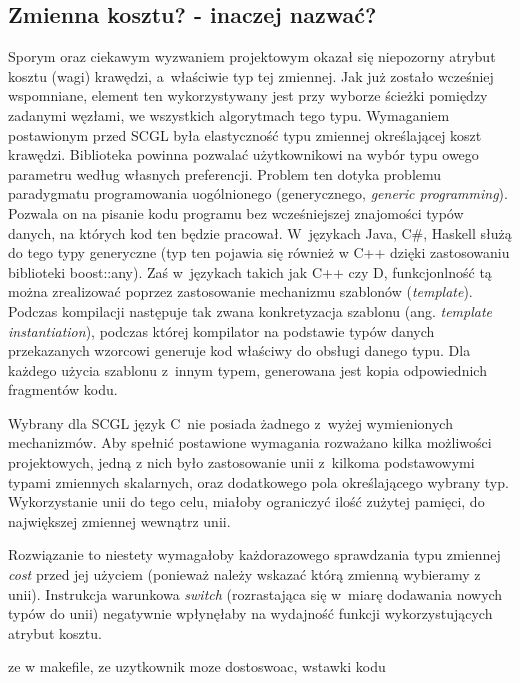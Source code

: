 \documentclass[a4paper,12pt]{thesis}
\begin{document}
\subsection{Zmienna kosztu? - inaczej nazwać?}
Sporym oraz ciekawym wyzwaniem projektowym okazał się niepozorny atrybut kosztu (wagi) krawędzi, a~właściwie typ tej zmiennej.
Jak już zostało wcześniej wspomniane, element ten wykorzystywany jest przy wyborze ścieżki pomiędzy zadanymi węzłami, we wszystkich algorytmach tego typu.
Wymaganiem postawionym przed SCGL była elastyczność typu zmiennej określającej koszt krawędzi.
Biblioteka powinna pozwalać użytkownikowi na wybór typu owego parametru według własnych preferencji.
Problem ten dotyka problemu paradygmatu programowania uogólnionego (generycznego, \emph{generic programming}).
Pozwala on na pisanie kodu programu bez wcześniejszej znajomości typów danych, na których kod ten będzie pracował.
W~językach Java, C#, Haskell służą do tego typy generyczne (typ ten pojawia się również w C++ dzięki zastosowaniu biblioteki boost::any).
Zaś w~językach takich jak C++ czy D, funkcjonlność tą można zrealizować poprzez zastosowanie mechanizmu szablonów (\emph{template}).
Podczas kompilacji następuje tak zwana konkretyzacja szablonu (ang. \emph{template instantiation}), podczas której kompilator na podstawie typów danych przekazanych wzorcowi generuje kod właściwy do obsługi danego typu.
Dla każdego użycia szablonu z~innym typem, generowana jest kopia odpowiednich fragmentów kodu.

Wybrany dla SCGL język C~nie posiada żadnego z~wyżej wymienionych mechanizmów.
Aby spełnić postawione wymagania rozważano kilka możliwości projektowych, jedną z nich było zastosowanie unii z~kilkoma podstawowymi typami zmiennych skalarnych, oraz dodatkowego pola określającego wybrany typ.
Wykorzystanie unii do tego celu, miałoby ograniczyć ilość zużytej pamięci, do największej zmiennej wewnątrz unii.

Rozwiązanie to niestety wymagałoby każdorazowego sprawdzania typu zmiennej \emph{cost} przed jej użyciem (ponieważ należy wskazać którą zmienną wybieramy z unii).
Instrukcja warunkowa \emph{switch} (rozrastająca się w~miarę dodawania nowych typów do unii) negatywnie wpłynęłaby na wydajność funkcji wykorzystujących atrybut kosztu.






ze w makefile, ze uzytkownik moze dostoswoac, wstawki kodu
\end{document}
